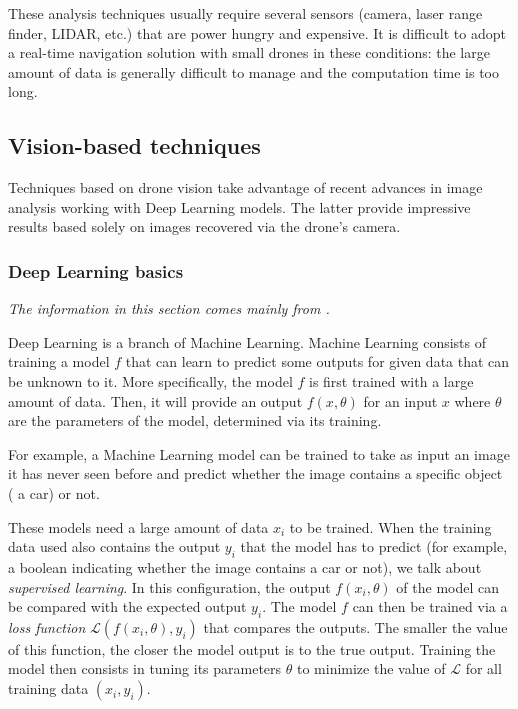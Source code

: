 These analysis techniques usually require several sensors (camera, laser range finder, LIDAR, etc.) that are power hungry and expensive. It is difficult to adopt a real-time navigation solution with small drones in these conditions: the large amount of data is generally difficult to manage and the computation time is too long.

\subsection{Vision-based techniques}

Techniques based on drone vision take advantage of recent advances in image analysis working with Deep Learning models. The latter provide impressive results based solely on images recovered via the drone's camera.

\subsubsection{Deep Learning basics}\label{sec:02.deep.learning.basics}

\emph{The information in this section comes mainly from \cite{goodfellow2016deep}.}

Deep Learning is a branch of Machine Learning. Machine Learning consists of training a model $f$ that can learn to predict some outputs for given data that can be unknown to it. More specifically, the model $f$ is first trained with a large amount of data. Then, it will provide an output $f(x, \theta)$ for an input $x$ where $\theta$ are the parameters of the model, determined via its training.

For example, a Machine Learning model can be trained to take as input an image it has never seen before and predict whether the image contains a specific object (\eg{} a car) or not.

These models need a large amount of data $x_i$ to be trained. When the training data used also contains the output $y_i$ that the model has to predict (for example, a boolean indicating whether the image contains a car or not), we talk about \emph{supervised learning}. In this configuration, the output $f(x_i, \theta)$ of the model can be compared with the expected output $y_i$. The model $f$ can then be trained via a \emph{loss function} $\mathcal{L}(f(x_i, \theta), y_i)$ that compares the outputs. The smaller the value of this function, the closer the model output is to the true output. Training the model then consists in tuning its parameters $\theta$ to minimize the value of $\mathcal{L}$ for all training data $(x_i, y_i)$.

